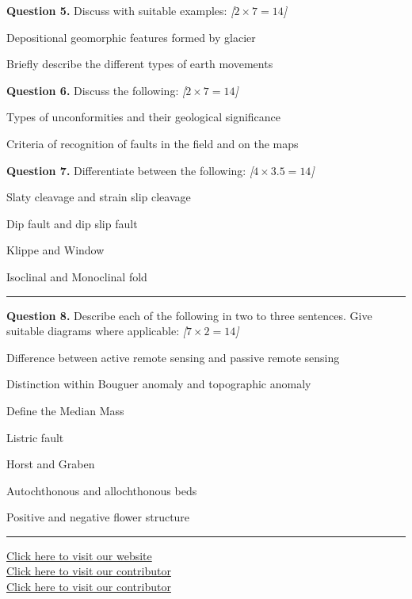 \documentclass[11pt,a4paper]{article}
\newcommand{\pts}[1]{\hfill   \textit{[#1]}}
\begin{document}
\medskip


\noindent   \textbf{Question 5.} Discuss with suitable examples: \pts{$2  \times 7 = 14$}

\begin{parts}
  \item Depositional geomorphic features formed by glacier
  \item Briefly describe the different types of earth movements
\end{parts}

\medskip


\noindent   \textbf{Question 6.} Discuss the following: \pts{$2  \times 7 = 14$}

\begin{parts}
  \item Types of unconformities and their geological significance
  \item Criteria of recognition of faults in the field and on the maps
\end{parts}

\medskip


\noindent   \textbf{Question 7.} Differentiate between the following: \pts{$4  \times 3.5 = 14$}

\begin{parts}
  \item Slaty cleavage and strain slip cleavage
  \item Dip fault and dip slip fault
  \item Klippe and Window
  \item Isoclinal and Monoclinal fold
\end{parts}

\bigskip


\rule{\linewidth}{0.4pt}\smallskip




\noindent   \textbf{Question 8.} Describe each of the following in two to three sentences. Give suitable diagrams where applicable: \pts{$7  \times 2 = 14$}

\begin{romanparts}
  \item Difference between active remote sensing and passive remote sensing
  \item Distinction within Bouguer anomaly and topographic anomaly
  \item Define the Median Mass
  \item Listric fault
  \item Horst and Graben
  \item Autochthonous and allochthonous beds
  \item Positive and negative flower structure
\end{romanparts}

\vfill\rule{\linewidth}{0.4pt}

\begin{center}\small
\href{https://bhu-exam.vercel.app/}{Click here to visit our website}\\[4pt]
\href{https://me-aryan.vercel.app/}{Click here to visit our contributor}\\[4pt]
\href{https://quashan-me.vercel.app/}{Click here to visit our contributor}
\end{center}
\end{document}
